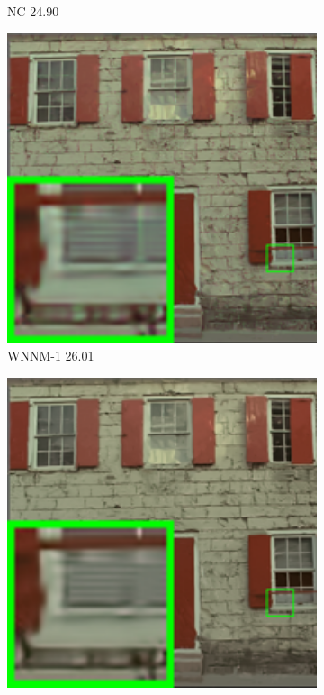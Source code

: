 \begin{figure}
\begin{subfigure}[t]{0.19\textwidth}
		\caption{NC 24.90}
    \end{subfigure}
    \hfill
    \begin{subfigure}[t]{0.19\textwidth}
        \centering
        \includegraphics[width=1\textwidth]{images/mcwnnm/24images/resize_br_WNNMCW_nSig402030_kodim01.png}
		\caption{WNNM-1 26.01}
    \end{subfigure}
    \hfill
    \begin{subfigure}[t]{0.19\textwidth}
        \centering
        \includegraphics[width=1\textwidth]{images/mcwnnm/24images/resize_br_WNNMJ_nSig402030_kodim01.png}

\end{subfigure}
\end{figure}
